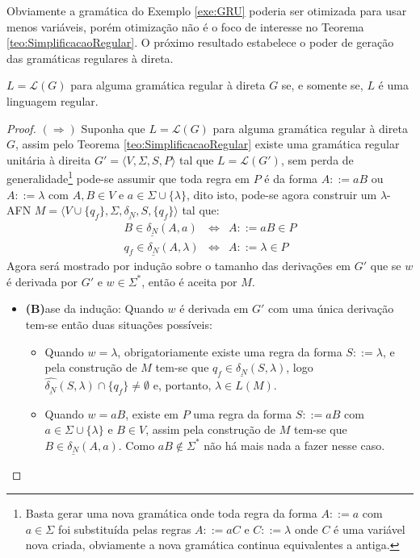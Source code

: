Obviamente a gramática do Exemplo \ref{exe:GRU} poderia ser otimizada para usar menos variáveis, porém otimização não é o foco de interesse no Teorema \ref{teo:SimplificacaoRegular}. O próximo resultado estabelece o poder de geração das gramáticas regulares à direta.

\begin{teorema}\label{teo:GRD-AFD}
	$L = \mathcal{L}(G)$ para alguma gramática regular à direta $G$ se, e somente se, $L$ é uma linguagem regular.
\end{teorema}

\begin{proof}
	$(\Rightarrow)$ Suponha que $L = \mathcal{L}(G)$ para alguma gramática regular à direta $G$, assim pelo Teorema \ref{teo:SimplificacaoRegular} existe uma gramática regular unitária à direita $G' = \langle V, \Sigma, S, P \rangle$ tal que $L = \mathcal{L}(G')$, sem perda de generalidade\footnote{Basta gerar uma nova gramática onde toda regra da forma $A ::= a$ com $a \in \Sigma$ foi substituída pelas regras $A ::= aC$ e $C ::= \lambda$ onde $C$ é uma variável nova criada, obviamente a nova gramática continua equivalentes a antiga.} pode-se assumir que toda regra em $P$ é da forma $A ::= aB$ ou $A ::= \lambda$ com $A, B \in V$ e $a \in \Sigma \cup \{\lambda\}$, dito isto, pode-se agora construir um $\lambda$-AFN $M = \langle V \cup \{q_f\}, \Sigma, \underline{\delta_N}, S, \{q_f\} \rangle$ tal que:
	\begin{eqnarray*}
		B \in \underline{\delta_N}(A, a) & \Longleftrightarrow & A ::= aB \in P\\
		q_f \in \underline{\delta_N}(A, \lambda)& \Longleftrightarrow & A ::= \lambda \in P
	\end{eqnarray*}
	Agora será mostrado por indução sobre o tamanho das derivações em $G'$ que se $w$ é derivada por $G'$ e $w \in \Sigma^*$, então é aceita por $M$.
	\begin{itemize}
		\item \textbf{(B)}ase da indução: Quando $w$ é derivada em $G'$ com uma única derivação tem-se então duas situações possíveis:
		\begin{itemize}
			\item[(1)] Quando $w = \lambda$, obrigatoriamente existe uma regra da forma $S ::= \lambda$, e pela construção de $M$ tem-se que $q_f \in \underline{\delta_N}(S, \lambda)$, logo $\widehat{\underline{\delta_N}}(S, \lambda) \cap \{q_f\} \neq \emptyset$ e, portanto, $\lambda \in L(M)$. 
			\item[(2)] Quando $w = aB$, existe em $P$ uma regra da forma $S ::= aB$ com $a \in \Sigma \cup \{\lambda\}$ e $B \in V$, assim pela construção de $M$ tem-se que $B \in \underline{\delta_N}(A, a)$. Como $aB \notin \Sigma^*$ não há mais nada a fazer nesse caso.
		\end{itemize}
		

\end{itemize}
\end{proof}
